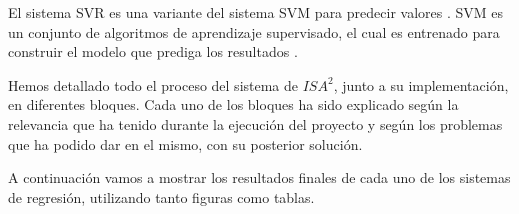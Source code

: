 El sistema \ac{SVR} es una variante del sistema \ac{SVM} para predecir valores \cite{SVR}. \ac{SVM} es un conjunto de algoritmos de aprendizaje supervisado, el cual es entrenado para construir el modelo que prediga los resultados \cite{SVR}.

Hemos detallado todo el proceso del sistema de $ISA^{2}$, junto a su implementación, en diferentes bloques. Cada uno de los bloques ha sido explicado según la relevancia que ha tenido durante la ejecución del proyecto y según los problemas que ha podido dar en el mismo, con su posterior solución.

A continuación vamos a mostrar los resultados finales de cada uno de los sistemas de regresión, utilizando tanto figuras como tablas.


